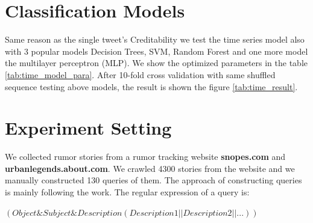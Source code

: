   \section{ Classification Models } 
Same reason as the single tweet's Creditability we test the time series model also with 3 popular models Decision Trees, SVM,  Random Forest and one more model the multilayer perceptron (MLP). We show the optimized parameters in the table \ref{tab:time_model_para}. After 10-fold cross validation with same shuffled sequence  testing above models, the result is shown the figure \ref{tab:time_result}.  

\begin{table}[!h]
 \centering
{}
 \caption{Parameters of Classification models}
 \label{tab:time_model_para}
\end{table}


\clearpage
  \section{Experiment Setting } 
\label{cha:Data_Collection}
We collected rumor stories from a rumor tracking website \textbf{snopes.com} and \textbf{urbanlegends.about.com}. We crawled 4300 stories from the website and we manually constructed 130 queries of them. The approach of constructing queries is mainly following the work\cite{gupta2014tweetcred}. The regular expression of a query is:

$(Object \& Subject \& Description(Description1||Description2||...))$


